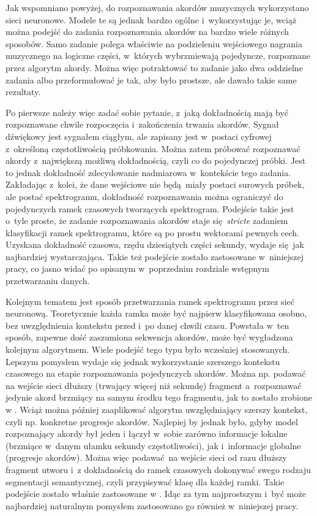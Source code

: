 Jak wspomniano powyżej, do rozpoznawania akordów muzycznych wykorzystano sieci neuronowe. Modele te są jednak bardzo ogólne i~wykorzystując je, wciąż można podejść do zadania rozpoznawania akordów na bardzo wiele różnych sposobów. Samo zadanie polega właściwie na podzieleniu wejściowego nagrania muzycznego na logiczne części, w~których wybrzmiewają pojedyncze, rozpoznane przez algorytm akordy.  Można więc potraktować to zadanie jako dwa oddzielne zadania albo przeformułować je tak, aby było prostsze, ale dawało takie same rezultaty. 

Po pierwsze należy więc zadać sobie pytanie, z~jaką dokładnością mają być rozpoznawane chwile rozpoczęcia i~zakończenia trwania akordów. Sygnał dźwiękowy jest sygnałem ciągłym, ale zapisany jest w~postaci cyfrowej z~określoną częstotliwością próbkowania. Można zatem próbować rozpoznawać akordy z~największą możliwą dokładnością, czyli co do pojedynczej próbki. Jest to jednak dokładność zdecydowanie nadmiarowa w~kontekście tego zadania. Zakładając z~kolei, że dane wejściowe nie będą miały postaci surowych próbek, ale postać spektrogramu, dokładność rozpoznawania można ograniczyć do pojedynczych ramek czasowych tworzących spektrogram. Podejście takie jest o~tyle proste, że zadanie rozpoznawania akordów staje się \emph{stricte} zadaniem klasyfikacji ramek spektrogramu, które są po prostu wektorami pewnych cech. Uzyskana dokładność czasowa, rzędu dziesiątych części sekundy, wydaje się jak najbardziej wystarczająca. Takie też podejście zostało zastosowane w~niniejszej pracy, co jasno widać po opisanym w~poprzednim rozdziale wstępnym przetwarzaniu danych.

Kolejnym tematem jest sposób przetwarzania ramek spektrogramu przez sieć neuronową. Teoretycznie każda ramka może być najpierw klasyfikowana osobno, bez uwzględnienia kontekstu przed i~po danej chwili czasu. Powstała w~ten sposób, zapewne dość zaszumiona sekwencja akordów, może być wygładzona kolejnym algorytmem. Wiele podejść tego typu było wcześniej stosowanych. Lepszym pomysłem wydaje się jednak wykorzystanie szerszego kontekstu czasowego na etapie rozpoznawania pojedynczych akordów.  Można np.  podawać na wejście sieci dłuższy (trwający więcej niż sekundę) fragment a~rozpoznawać jedynie akord brzmiący na samym środku tego fragmentu, jak to zostało zrobione w \cite{korzeniowski_fully_2016}.  Wciąż można później zaaplikować algorytm uwzględniający szerszy kontekst, czyli np. konkretne progresje akordów. Najlepiej by jednak było, gdyby model rozpoznający akordy był jeden i łączył w~sobie zarówno informacje lokalne (brzmiące w~danym ułamku sekundy częstotliwości), jak i~informacje globalne (progresje akordów). Można więc podawać na wejście sieci od razu dłuższy fragment utworu i~z dokładnością do ramek czasowych dokonywać swego rodzaju segmentacji semantycznej, czyli przypisywać klasę dla każdej ramki. Takie podejście zostało właśnie zastosowane w \cite{park_bi-directional_2019}. Idąc za tym najprostszym i~być może najbardziej naturalnym pomysłem zastosowano go również w~niniejszej pracy. 



